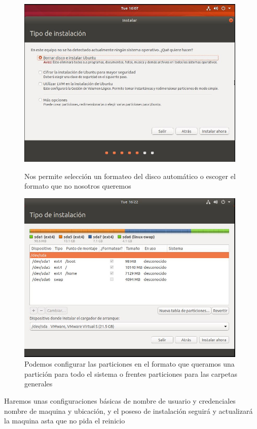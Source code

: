\documentclass[preprint,11pt]{elsarticle}
\begin{document}
\begin{figure}[!htbp]
    \begin{center}
        \includegraphics[width=11cm]{anex/ubuntu3.JPG}
    \end{center}
    \caption{Nos permite selección un formateo del disco automático o escoger el formato que no nosotros queremos}
    \begin{center}
        \includegraphics[width=11cm]{anex/ubuntu4.JPG}
    \end{center}
    \caption{Podemos configurar las particiones en el formato que queramos una partición para todo el sistema o frentes particiones para las carpetas generales}
\end{figure}

Haremos unas configuraciones básicas de nombre de usuario y credenciales nombre de maquina y ubicación, y el poseso de instalación seguirá y actualizará la maquina asta que no pida el reinicio
\end{document}
